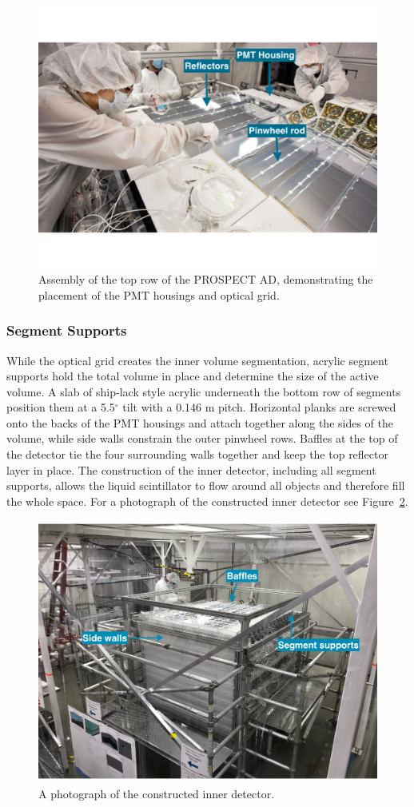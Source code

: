 \begin{figure}[]
	\centering
	\includegraphics[width=0.7\linewidth]{tex/4-prospect-images/RowAssembly}
	\caption[Construction of a row]{Assembly of the top row of the PROSPECT AD, demonstrating the placement of the PMT housings and optical grid.}
	\label{fig:rowassembly}
\end{figure}


\subsubsection{Segment Supports}

While the optical grid creates the inner volume segmentation, acrylic segment supports hold the total volume in place and determine the size of the active volume.
A slab of ship-lack style acrylic underneath the bottom row of segments position them at a 5.5$^{\circ}$ tilt with a 0.146 m pitch.
Horizontal planks are screwed onto the backs of the PMT housings and attach together along the sides of the volume, while side walls constrain the outer pinwheel rows. 
Baffles at the top of the detector tie the four surrounding walls together and keep the top reflector layer in place. 
The construction of the inner detector, including all segment supports, allows the liquid scintillator to flow around all objects and therefore fill the whole space.
For a photograph of the constructed inner detector see Figure~\ref{fig:completeddetector}.
\begin{figure}[h]
	\centering
	\includegraphics[width=0.7\linewidth]{tex/4-prospect-images/CompletedDetector}
	\caption[Completed inner detector]{A photograph of the constructed inner detector.}
	\label{fig:completeddetector}
\end{figure}


